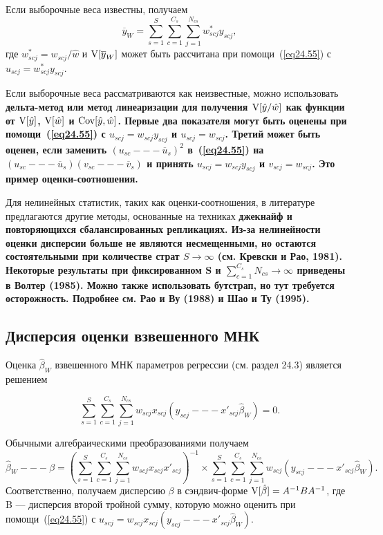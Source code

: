 Если выборочные веса известны, получаем
$$
\overline{y}_W = \sum_{s=1}^S \sum_{c=1}^{C_s} \sum_{j=1}^{N_{cs}} w^*_{scj} y_{scj},
$$
где $w^*_{scj} =w_{scj} / \hat w$ и $\mathrm{V}[\overline{y}_W]$ может быть рассчитана при помощи~(\ref{eq24.55}) с $u_{scj} = w^*_{scj} y_{scj}$. 

Если выборочные веса рассматриваются как неизвестные, можно использовать \bfseries дельта-метод \mdseries или \bfseries  метод линеаризации \mdseries для получения $\mathrm{V}[\hat y / \hat w]$ как функции от $\mathrm{V}[\hat y]$, $\mathrm{V}[\hat w]$ и $\mathrm{Cov}[\hat y, \hat w]$. Первые два показателя могут быть оценены при помощи~(\ref{eq24.55}) с $u_{scj} = w_{scj} y_{scj}$ и $u_{scj} = w_{scj}$. Третий может быть оценен, если заменить $(u_{sc} --- \overline{u}_s)^2$ в~(\ref{eq24.55}) на $(u_{sc} --- \overline{u}_s) (v_{sc} --- \overline{v}_s)$ и принять $u_{scj} = w_{scj} y_{scj}$ и $v_{scj} = w_{scj}$. Это пример оценки-соотношения. 

Для нелинейных статистик, таких как оценки-соотношения, в литературе предлагаются другие методы, основанные на техниках \bfseries джекнайф \mdseries и \bfseries повторяющихся сбалансированных репликациях. \mdseries Из-за нелинейности оценки дисперсии больше не являются несмещенными, но остаются состоятельными при количестве страт $S \to \infty$ (см. Кревски и Рао, 1981). Некоторые результаты при фиксированном S и $\sum_{c=1}^{C_s} N_{cs} \to \infty$ приведены в Волтер (1985). Можно также использовать \bfseries бутстрап\mdseries, но тут требуется осторожность. Подробнее см. Рао и Ву (1988) и Шао и Ту (1995). 


\subsection*{Дисперсия оценки взвешенного МНК}

Оценка $\hat \beta_W$ взвешенного МНК параметров регрессии (см. раздел 24.3) является решением

$$
\sum_{s=1}^S \sum_{c=1}^{C_s} \sum_{j=1}^{N_{cs}} w_{scj} x_{scj} (y_{scj} --- x'_{scj} \hat \beta_W) = 0.
$$

Обычными алгебраическими преобразованиями получаем
$$
\hat \beta_W --- \beta = \left( \sum_{s=1}^S \sum_{c=1}^{C_s} \sum_{j=1}^{N_{cs}} w_{scj} x_{scj} x'_{scj} \right)^{-1} \times \sum_{s=1}^S \sum_{c=1}^{C_s} \sum_{j=1}^{N_{cs}} w_{scj} (y_{scj} --- x'_{scj} \hat \beta_W).
$$
Соответственно, получаем дисперсию $\beta$ в сэндвич-форме $\mathrm{V}[\hat \beta] = A^{-1} B A^{-1}$, где B --- дисперсия второй тройной сумму, которую можно оценить при помощи~(\ref{eq24.55}) с $u_{scj} = w_{scj} x_{scj} (y_{scj} --- x'_{scj} \hat \beta_W)$. 

